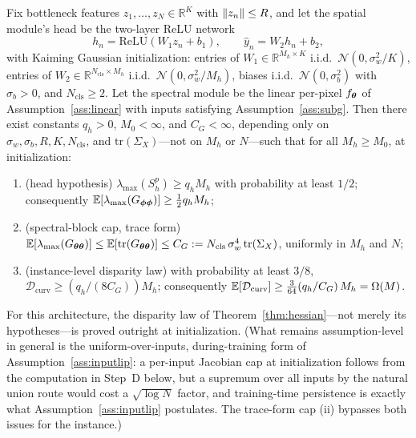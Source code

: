 \begin{proposition}
\label{prop:verified_instance}
Fix bottleneck features $z_1, \dots, z_N \in \mathbb{R}^K$ with
$\left\lVert z_n\right\rVert \leq R$, and let the spatial module's head be the
two-layer ReLU network
\[
    h_n = \mathrm{ReLU}(W_1 z_n + b_1),
    \qquad
    \hat{y}_n = W_2 h_n + b_2,
\]
with Kaiming Gaussian initialization: entries of
$W_1 \in \mathbb{R}^{M_h \times K}$ i.i.d.\
$\mathcal{N}(0, \sigma_w^2/K)$, entries of
$W_2 \in \mathbb{R}^{N_{\mathrm{cls}} \times M_h}$ i.i.d.\
$\mathcal{N}(0, \sigma_w^2/M_h)$, biases i.i.d.\
$\mathcal{N}(0, \sigma_b^2)$ with $\sigma_b > 0$, and
$N_{\mathrm{cls}} \geq 2$. Let the spectral module be the linear
per-pixel $f_{\boldsymbol{\theta}}$ of Assumption~\ref{ass:linear} with inputs
satisfying Assumption~\ref{ass:subg}. Then there exist constants
$q_h > 0$, $M_0 < \infty$, and $C_G < \infty$, depending only on
$\sigma_w, \sigma_b, R, K, N_{\mathrm{cls}}$, and
$\mathrm{tr}(\Sigma_X)$---not on $M_h$ or $N$---such
that for all $M_h \geq M_0$, at initialization:
\begin{enumerate}
    \item[(i)] (head hypothesis)
    $\lambda_{\max}(S_h^{p}) \geq q_h M_h$ with probability at least
    $1/2$; consequently
    $\mathbb{E}[\lambda_{\max}(G_{{\boldsymbol{\phi}}{\boldsymbol{\phi}}})] \geq \tfrac{1}{2} q_h M_h$;
    \item[(ii)] (spectral-block cap, trace form)
    $\mathbb{E}[\lambda_{\max}(G_{{\boldsymbol{\theta}}{\boldsymbol{\theta}}})]
    \leq \mathbb{E}[\mathrm{tr}(G_{{\boldsymbol{\theta}}{\boldsymbol{\theta}}})] \leq C_G :=
    N_{\mathrm{cls}}\, \sigma_w^4\, \mathrm{tr}(\Sigma_X)$,
    uniformly in $M_h$ and $N$;
    \item[(iii)] (instance-level disparity law) with probability at
    least $3/8$,
    $\mathcal{D}_{\mathrm{curv}} \geq \left( q_h / (8 C_G) \right)
    M_h$; consequently
    $\mathbb{E}[\mathcal{D}_{\mathrm{curv}}] \geq
    \tfrac{3}{64} (q_h / C_G)\, M_h = \Omega(M)$.
\end{enumerate}
For this architecture, the disparity law of
Theorem~\ref{thm:hessian}---not merely its hypotheses---is proved
outright at initialization. (What remains assumption-level in
general is the uniform-over-inputs, during-training form of
Assumption~\ref{ass:inputlip}: a per-input Jacobian cap at
initialization follows from the computation in Step~D below, but a
supremum over all inputs by the natural union route would cost a
$\sqrt{\log N}$ factor, and training-time persistence is exactly
what Assumption~\ref{ass:inputlip} postulates. The trace-form cap
(ii) bypasses both issues for the instance.)
\end{proposition}

